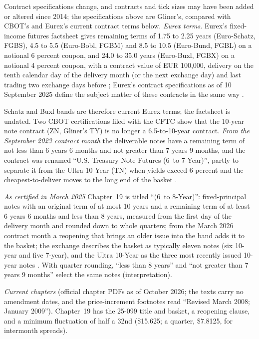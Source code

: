\begin{qfconvention}
 Contract specifications change, and contracts and tick sizes may have been added or altered since 2014; the specifications above are Gliner's, compared with CBOT's and Eurex's current contract terms below. \emph{Eurex terms}. Eurex's fixed-income futures factsheet gives remaining terms of 1.75 to 2.25 years (Euro-Schatz, FGBS), 4.5 to 5.5 (Euro-Bobl, FGBM) and 8.5 to 10.5 (Euro-Bund, FGBL) on a notional 6 percent coupon, and 24.0 to 35.0 years (Euro-Buxl, FGBX) on a notional 4 percent coupon, with a contract value of EUR 100,000, delivery on the tenth calendar day of the delivery month (or the next exchange day) and last trading two exchange days before \citep[pp.~1--2]{eurex-fi-factsheet}; Eurex's contract specifications as of 10 September 2025 define the subject matter of these contracts in the same way \citep[sec.~1.2.1, p.~1]{eurex-cs-2025}.

Schatz and Buxl bands are therefore current Eurex terms; the factsheet is undated. Two CBOT certifications filed with the CFTC show that the 10-year note contract (ZN, Gliner's TY) is no longer a 6.5-to-10-year contract. \emph{From the September 2023 contract month} the deliverable notes have a remaining term of not less than 6 years 6 months and not greater than 7 years 9 months, and the contract was renamed ``U.S. Treasury Note Futures (6\textonehalf\ to 7\textthreequarters-Year)'', partly to separate it from the Ultra 10-Year (TN) when yields exceed 6 percent and the cheapest-to-deliver moves to the long end of the basket \citep[Submission 22-468, pp.~1--2]{cbot-22-468}.

\emph{As certified in March 2025} Chapter~19 is titled ``(6\textonehalf\ to 8-Year)'': fixed-principal notes with an original term of at most 10 years and a remaining term of at least 6 years 6 months and less than 8 years, measured from the first day of the delivery month and rounded down to whole quarters; from the March 2026 contract month a reopening that brings an older issue into the band adds it to the basket; the exchange describes the basket as typically eleven notes (six 10-year and five 7-year), and the Ultra 10-Year as the three most recently issued 10-year notes \citep[Submission 25-099, pp.~1--4]{cbot-25-099}. With quarter rounding, ``less than 8 years'' and ``not greater than 7 years 9 months'' select the same notes (interpretation).

\emph{Current chapters} (official chapter PDFs as of October 2026; the texts carry no amendment dates, and the price-increment footnotes read ``Revised March 2008; January 2009''). Chapter~19 has the 25-099 title and basket, a reopening clause, and a minimum fluctuation of half a 32nd (\$15.625; a quarter, \$7.8125, for intermonth spreads).


\end{qfconvention}
